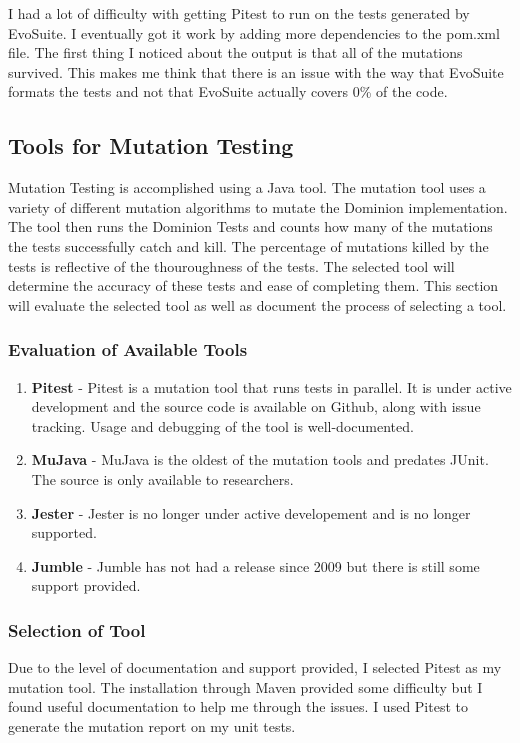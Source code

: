 \documentclass[letterpaper,10pt]{article}
\begin{document}
		I had a lot of difficulty with getting Pitest to run on the tests generated by 
		EvoSuite. I eventually got it work by adding more dependencies to the pom.xml file. 
		The first thing I noticed about the output is that all of the mutations survived. 
		This makes me think that there is an issue with the way that EvoSuite formats the 
		tests and not that EvoSuite actually covers 0\% of the code.
	\subsection{Tools for Mutation Testing}
	Mutation Testing is accomplished using a Java tool. The mutation tool uses a variety of 
	different mutation algorithms to mutate the Dominion implementation. The tool then runs the 
	Dominion Tests and counts how many of the mutations the tests successfully catch and kill. 
	The percentage of mutations killed by the tests is reflective of the thouroughness of the 
	tests. The selected tool will determine the accuracy of these tests and ease of completing 
	them. This section will evaluate the selected tool as well as document the process of 
	selecting a tool.
		\subsubsection{Evaluation of Available Tools}
		\begin{enumerate}
			\item{\textbf{Pitest} - Pitest is a mutation tool that runs tests in parallel.
				It is under active development and the source code is available on 
				Github, along with issue tracking. Usage and debugging of the tool is
				 well-documented.}
			\item{\textbf{MuJava} - MuJava is the oldest of the mutation tools and 
				predates JUnit. The source is only available to researchers.}
			\item{\textbf{Jester} - Jester is no longer under active developement and is 
				no longer supported.}
			\item{\textbf{Jumble} - Jumble has not had a release since 2009 but there is 
				still some support provided.}
		\end{enumerate}
		\subsubsection{Selection of Tool}
		Due to the level of documentation and support provided, I selected Pitest as my 
		mutation tool. The installation through Maven provided some difficulty but I found 
		useful documentation to help me through the issues. I used Pitest to generate the 
		mutation report on my unit tests.
\end{document}
